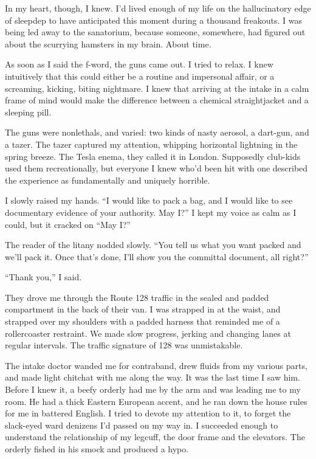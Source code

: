 In my heart, though, I knew. I’d lived enough of my life on the
hallucinatory edge of sleepdep to have anticipated this moment
during a thousand freakouts. I was being led away to the
sanatorium, because someone, somewhere, had figured out about the
scurrying hamsters in my brain. About time.

As soon as I said the f-word, the guns came out. I tried to relax.
I knew intuitively that this could either be a routine and
impersonal affair, or a screaming, kicking, biting nightmare. I
knew that arriving at the intake in a calm frame of mind would make
the difference between a chemical straightjacket and a sleeping
pill.

The guns were nonlethals, and varied: two kinds of nasty aerosol, a
dart-gun, and a tazer. The tazer captured my attention, whipping
horizontal lightning in the spring breeze. The Tesla enema, they
called it in London. Supposedly club-kids used them recreationally,
but everyone I knew who’d been hit with one described the
experience as fundamentally and uniquely horrible.

I slowly raised my hands. “I would like to pack a bag, and I would
like to see documentary evidence of your authority. May I?” I kept
my voice as calm as I could, but it cracked on “May I?”

The reader of the litany nodded slowly. “You tell us what you want
packed and we’ll pack it. Once that’s done, I’ll show you the
committal document, all right?”

“Thank you,” I said.

They drove me through the Route 128 traffic in the sealed and
padded compartment in the back of their van. I was strapped in at
the waist, and strapped over my shoulders with a padded harness
that reminded me of a rollercoaster restraint. We made slow
progress, jerking and changing lanes at regular intervals. The
traffic signature of 128 was unmistakable.

The intake doctor wanded me for contraband, drew fluids from my
various parts, and made light chitchat with me along the way. It
was the last time I saw him. Before I knew it, a beefy orderly had
me by the arm and was leading me to my room. He had a thick Eastern
European accent, and he ran down the house rules for me in battered
English. I tried to devote my attention to it, to forget the
slack-eyed ward denizens I’d passed on my way in. I succeeded
enough to understand the relationship of my legcuff, the door frame
and the elevators. The orderly fished in his smock and produced a
hypo.

